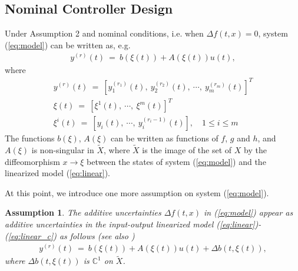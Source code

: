 \documentclass[twoside,leqno,onecolumn]{article}
\newtheorem{assumption}{Assumption}
\begin{document}
\subsection{Nominal Controller Design} \label{sec:norm}
Under Assumption 2 and nominal conditions, i.e. when $\Delta
f(t,x) = 0$, system (\ref{eq:model}) can be written as, e.g.
\cite{I89}
\begin{align}
\label{eq:linear} y^{(r)}(t) ~=~ b(\xi(t)) + A (\xi(t)) u(t),
\end{align}
where
\begin{equation}
\begin{array}{l}
\displaystyle y^{(r)}(t) ~=~ [y^{(r_1)}_{1}(t), ~y^{(r_2)}_{2}(t),~\cdots,~ y^{(r_m)}_{m}(t)]^T\\
\displaystyle \xi(t) ~=~ [\xi^1(t),~\cdots,~\xi^m(t)]^T\\
\displaystyle \xi ^i(t) ~=~[y_i(t),~\cdots,~y_i^{(r_i-1)}(t)],
\quad 1\leq i\leq m
\end{array}
\label{eq:linear_c}
\end{equation}
The functions $b(\xi)$, $A(\xi)$ can be written as functions of
$f$, $g$ and $h$, and $A(\xi)$ is non-singular in $\tilde{X}$,
where $\tilde X$ is the image of the set of $X$ by the
diffeomorphism $x\rightarrow\xi$ between the states of system
(\ref{eq:model}) and the linearized model (\ref{eq:linear}).

At this point, we introduce one more assumption on system
(\ref{eq:model}).

\begin{assumption}
The additive uncertainties $\Delta f(t,x)$ in (\ref{eq:model})
appear as additive uncertainties in the input-output linearized
model (\ref{eq:linear})-(\ref{eq:linear_c}) as follows (see also
\cite{Beno09})
\begin{align}
\label{eq:model_un} y^{(r)}(t) ~=~ b(\xi(t)) + A (\xi(t)) u(t) +
\Delta b(t,\xi(t)),
\end{align}
where $\Delta b(t,\xi(t))$ is $\mathbb{C}^1$ on $\tilde X$.
\end{assumption}
\end{document}

